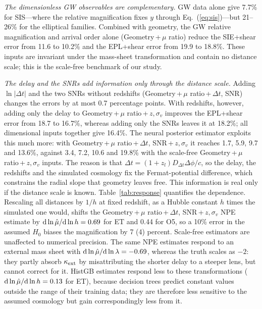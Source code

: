 \emph{The dimensionless GW observables are complementary.} GW data alone give 7.7\% for SIS---where the relative magnification fixes $y$ through Eq.~(\ref{eq:sis})---but 21--26\% for the elliptical families. Combined with geometry, the GW relative magnification and arrival order alone (Geometry\,+\,$\mu$ ratio) reduce the SIE+shear error from 11.6 to 10.2\% and the EPL+shear error from 19.9 to 18.8\%. These inputs are invariant under the mass-sheet transformation and contain no distance scale; this is the scale-free benchmark of our study.

\emph{The delay and the SNRs add information only through the distance scale.} Adding $\ln|\Delta t|$ and the two SNRs without redshifts (Geometry\,+\,$\mu$ ratio\,+\,$\Delta t$, SNR) changes the errors by at most 0.7 percentage points. With redshifts, however, adding only the delay to Geometry\,+\,$\mu$ ratio\,+\,$z,\sigma_v$ improves the EPL+shear error from 18.7 to 16.7\%, whereas adding only the SNRs leaves it at 18.2\%; all dimensional inputs together give 16.4\%. The neural posterior estimator exploits this much more: with Geometry\,+\,$\mu$ ratio\,+\,$\Delta t$, SNR\,+\,$z,\sigma_v$ it reaches 1.7, 5.9, 9.7 and 13.6\%, against 3.4, 7.2, 10.6 and 19.8\% with the scale-free Geometry\,+\,$\mu$ ratio\,+\,$z,\sigma_v$ inputs. The reason is that $\Delta t=(1+z_l)D_{\Delta t}\Delta\phi/c$, so the delay, the redshifts and the simulated cosmology fix the Fermat-potential difference, which constrains the radial slope that geometry leaves free. This information is real only if the distance scale is known. Table~\ref{tab:response} quantifies the dependence. Rescaling all distances by $1/h$ at fixed redshift, as a Hubble constant $h$ times the simulated one would, shifts the Geometry\,+\,$\mu$ ratio\,+\,$\Delta t$, SNR\,+\,$z,\sigma_v$ NPE estimate by ${\rm d}\ln\hat\mu/{\rm d}\ln h=0.69$ for ET and 0.44 for O5, so a 10\% error in the assumed $H_0$ biases the magnification by 7 (4) percent. Scale-free estimators are unaffected to numerical precision. The same NPE estimates respond to an external mass sheet with ${\rm d}\ln\hat\mu/{\rm d}\ln\lambda=-0.69$, whereas the truth scales as $-2$: they partly absorb $\kappa_{\rm ext}$ by misattributing the shorter delay to a steeper lens, but cannot correct for it. HistGB estimates respond less to these transformations (${\rm d}\ln\hat\mu/{\rm d}\ln h=0.13$ for ET), because decision trees predict constant values outside the range of their training data; they are therefore less sensitive to the assumed cosmology but gain correspondingly less from it.

